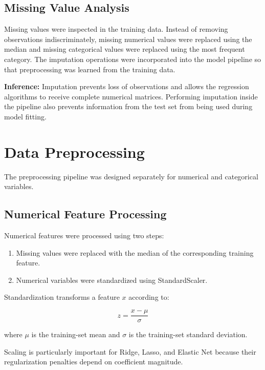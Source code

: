 \documentclass[12pt,a4paper]{article}
\begin{document}
\subsection{Missing Value Analysis}

Missing values were inspected in the training data. Instead of removing observations indiscriminately, missing numerical values were replaced using the median and missing categorical values were replaced using the most frequent category. The imputation operations were incorporated into the model pipeline so that preprocessing was learned from the training data.

\textbf{Inference:} Imputation prevents loss of observations and allows the regression algorithms to receive complete numerical matrices. Performing imputation inside the pipeline also prevents information from the test set from being used during model fitting.

\section{Data Preprocessing}

The preprocessing pipeline was designed separately for numerical and categorical variables.

\subsection{Numerical Feature Processing}

Numerical features were processed using two steps:

\begin{enumerate}
    \item Missing values were replaced with the median of the corresponding training feature.
    \item Numerical variables were standardized using StandardScaler.
\end{enumerate}

Standardization transforms a feature $x$ according to:

\[
z = \frac{x-\mu}{\sigma}
\]

where $\mu$ is the training-set mean and $\sigma$ is the training-set standard deviation.

Scaling is particularly important for Ridge, Lasso, and Elastic Net because their regularization penalties depend on coefficient magnitude.
\end{document}
